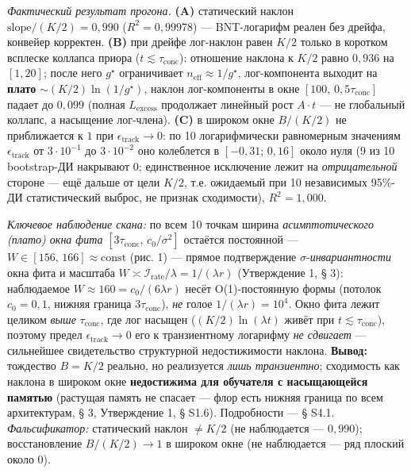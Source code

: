 \documentclass[12pt]{iopart}
\begin{document}
\emph{Фактический результат прогона.} \textbf{(A)} статический наклон \(\mathrm{slope}/(K/2) = 0{,}990\) (\(R^2 = 0{,}99978\)) --- BNT-логарифм реален без дрейфа, конвейер корректен. \textbf{(B)} при дрейфе лог-наклон равен \(K/2\) только в коротком всплеске коллапса приора (\(t \lesssim \tau_{\text{conc}}\)): отношение наклона к \(K/2\) равно \(0{,}936\) на \([1,20]\); после него \(g^\star\) ограничивает \(n_{\text{eff}} \approx 1/g^\star\), лог-компонента выходит на \textbf{плато} \(\sim (K/2)\ln(1/g^\star)\), наклон лог-компоненты в окне \([100,\,0{,}5\tau_{\text{conc}}]\) падает до \(0{,}099\) (полная \(L_{\text{excess}}\) продолжает линейный рост \(A\cdot t\) --- не глобальный коллапс, а насыщение лог-члена). \textbf{(C)} в широком окне \(B/(K/2)\) не приближается к \(1\) при \(\epsilon_{\text{track}} \to 0\): по 10 логарифмически равномерным значениям \(\epsilon_{\text{track}}\) от \(3\cdot10^{-1}\) до \(3\cdot10^{-2}\) оно колеблется в \([-0{,}31;\,0{,}16]\) около нуля (9 из 10 bootstrap-ДИ накрывают \(0\); единственное исключение лежит на \emph{отрицательной} стороне --- ещё дальше от цели \(K/2\), т.е. ожидаемый при 10 независимых 95\%-ДИ статистический выброс, не признак сходимости), \(R^2 = 1{,}000\).



\emph{Ключевое наблюдение скана:} по всем 10 точкам ширина \emph{асимптотического (плато) окна фита} \([3\tau_{\text{conc}},\,c_0/\sigma^2]\) остаётся постоянной --- \(W \in [156,\,166] \approx \text{const}\) (рис. 1) --- прямое подтверждение \(\sigma\)-\emph{инвариантности} окна фита и масштаба \(W \asymp \mathcal I_{\text{rate}}/\lambda = 1/(\lambda r)\) (Утверждение 1, § 3): наблюдаемое \(W \approx 160 = c_0/(6\lambda r)\) несёт O(1)-постоянную формы (потолок \(c_0 = 0{,}1\), нижняя граница \(3\tau_{\text{conc}}\)), \emph{не} голое \(1/(\lambda r) = 10^4\). Окно фита лежит целиком \emph{выше} \(\tau_{\text{conc}}\), где лог насыщен (\((K/2)\ln(\lambda t)\) живёт при \(t\lesssim\tau_{\text{conc}}\)), поэтому предел \(\epsilon_{\text{track}}\to0\) его к транзиентному логарифму \emph{не сдвигает} --- сильнейшее свидетельство структурной недостижимости наклона. \textbf{Вывод:} тождество \(B = K/2\) реально, но реализуется \emph{лишь транзиентно}; сходимость как наклона в широком окне \textbf{недостижима для обучателя с насыщающейся памятью} (растущая память не спасает --- флор есть нижняя граница по всем архитектурам, § 3, Утверждение 1, § S1.6). Подробности --- § S4.1. \emph{Фальсификатор:} статический наклон \(\neq K/2\) (не наблюдается --- \(0{,}990\)); восстановление \(B/(K/2) \to 1\) в широком окне (не наблюдается --- ряд плоский около \(0\)).
\end{document}
